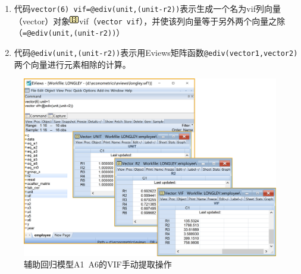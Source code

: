 \documentclass[12pt,(landscape,a4paper),(portrait,a4paper)]{article}
\providecommand{\tightlist}{%
  \setlength{\itemsep}{0pt}\setlength{\parskip}{0pt}}
\begin{document}
\begin{itemize}
\begin{enumerate}
    \begin{enumerate}
    \def\labelenumii{\alph{enumii}.}
    \tightlist
    \item
      代码\texttt{vector(6)\ vif=@ediv(unit,(unit-r2))}表示生成一个名为vif列向量（vector）对象\includegraphics{picture/object/Vector.png}vif（\texttt{vector\ vif}），并使该列向量等于另外两个向量之除（\texttt{=@ediv(unit,(unit-r2))}）
    \item
      代码\texttt{@ediv(unit,(unit-r2))}表示用Eviews矩阵函数\texttt{@ediv(vector1,vector2)}两个向量进行元素相除的计算。
    \end{enumerate}
  \end{enumerate}
\end{itemize}

\begin{figure}

{\centering \includegraphics[width=8in]{picture/lab5-multilinearity/3-vector-VIF} 

}

\caption{辅助回归模型A1~A6的VIF手动提取操作}\label{fig:fig-vector-VIF}
\end{figure}
\end{document}
